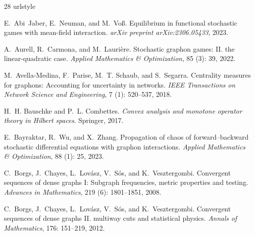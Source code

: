 \documentclass[11pt]{article}
\numberwithin{equation}{section}
\begin{document}
\begin{thebibliography}{28}
\providecommand{\natexlab}[1]{#1}
\providecommand{\url}[1]{\texttt{#1}}
\expandafter\ifx\csname urlstyle\endcsname\relax
  \providecommand{\doi}[1]{doi: #1}\else
  \providecommand{\doi}{doi: \begingroup \urlstyle{rm}\Url}\fi

E.~Abi~Jaber, E.~Neuman, and M.~Vo{\ss}.
\newblock Equilibrium in functional stochastic games with mean-field interaction.
\newblock \emph{arXiv preprint arXiv:2306.05433}, 2023.

A.~Aurell, R.~Carmona, and M.~Lauri{\`e}re.
\newblock Stochastic graphon games: {II}. the linear-quadratic case.
\newblock \emph{Applied Mathematics \& Optimization}, 85 (3): 39, 2022.

M.~Avella-Medina, F.~Parise, M.~T. Schaub, and S.~Segarra.
\newblock Centrality measures for graphons: Accounting for uncertainty in networks.
\newblock \emph{IEEE Transactions on Network Science and Engineering}, 7 (1): 520--537, 2018.

H.~H. Bauschke and P.~L. Combettes.
\newblock \emph{Convex analysis and monotone operator theory in Hilbert spaces}.
\newblock Springer, 2017.

E.~Bayraktar, R.~Wu, and X.~Zhang.
\newblock Propagation of chaos of forward--backward stochastic differential equations with graphon interactions.
\newblock \emph{Applied Mathematics \& Optimization}, 88 (1): 25, 2023.

C.~Borgs, J.~Chayes, L.~Lov{\'a}sz, V.~S{\'o}s, and K.~Vesztergombi.
\newblock Convergent sequences of dense graphs {I}: Subgraph frequencies, metric properties and testing.
\newblock \emph{Advances in Mathematics}, 219 (6): 1801--1851, 2008.

C.~Borgs, J.~Chayes, L.~Lov{\'a}sz, V.~S{\'o}s, and K.~Vesztergombi.
\newblock Convergent sequences of dense graphs {II}. multiway cuts and statistical physics.
\newblock \emph{Annals of Mathematics}, 176: 151--219, 2012.


\end{thebibliography}
\end{document}
